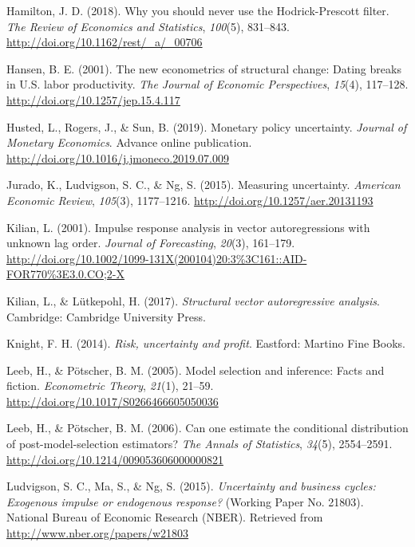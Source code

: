 \documentclass[12pt,twoside]{reedthesis}
\begin{document}
\leavevmode\hypertarget{ref-hamilton:2018}{}%
Hamilton, J. D. (2018). Why you should never use the Hodrick-Prescott filter. \emph{The Review of Economics and Statistics}, \emph{100}(5), 831--843. \url{http://doi.org/10.1162/rest/_a/_00706}

\leavevmode\hypertarget{ref-hansen:2001}{}%
Hansen, B. E. (2001). The new econometrics of structural change: Dating breaks in U.S. labor productivity. \emph{The Journal of Economic Perspectives}, \emph{15}(4), 117--128. \url{http://doi.org/10.1257/jep.15.4.117}

\leavevmode\hypertarget{ref-hustrogesun:2019}{}%
Husted, L., Rogers, J., \& Sun, B. (2019). Monetary policy uncertainty. \emph{Journal of Monetary Economics}. Advance online publication. \url{http://doi.org/10.1016/j.jmoneco.2019.07.009}

\leavevmode\hypertarget{ref-juraludvng:2015}{}%
Jurado, K., Ludvigson, S. C., \& Ng, S. (2015). Measuring uncertainty. \emph{American Economic Review}, \emph{105}(3), 1177--1216. \url{http://doi.org/10.1257/aer.20131193}

\leavevmode\hypertarget{ref-kilian:2001}{}%
Kilian, L. (2001). Impulse response analysis in vector autoregressions with unknown lag order. \emph{Journal of Forecasting}, \emph{20}(3), 161--179. \url{http://doi.org/10.1002/1099-131X(200104)20:3\%3C161::AID-FOR770\%3E3.0.CO;2-X}

\leavevmode\hypertarget{ref-kililutk:2017}{}%
Kilian, L., \& Lütkepohl, H. (2017). \emph{Structural vector autoregressive analysis}. Cambridge: Cambridge University Press.

\leavevmode\hypertarget{ref-knight:2014}{}%
Knight, F. H. (2014). \emph{Risk, uncertainty and profit}. Eastford: Martino Fine Books.

\leavevmode\hypertarget{ref-leebpots:2005}{}%
Leeb, H., \& Pötscher, B. M. (2005). Model selection and inference: Facts and fiction. \emph{Econometric Theory}, \emph{21}(1), 21--59. \url{http://doi.org/10.1017/S0266466605050036}

\leavevmode\hypertarget{ref-leebpots:2006}{}%
Leeb, H., \& Pötscher, B. M. (2006). Can one estimate the conditional distribution of post-model-selection estimators? \emph{The Annals of Statistics}, \emph{34}(5), 2554--2591. \url{http://doi.org/10.1214/009053606000000821}

\leavevmode\hypertarget{ref-ludvmang:2015}{}%
Ludvigson, S. C., Ma, S., \& Ng, S. (2015). \emph{Uncertainty and business cycles: Exogenous impulse or endogenous response?} (Working Paper No. 21803). National Bureau of Economic Research (NBER). Retrieved from \url{http://www.nber.org/papers/w21803}
\end{document}
